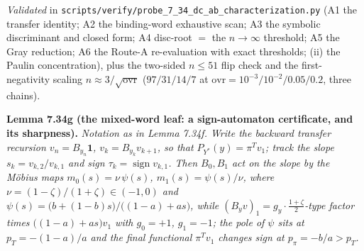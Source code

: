 \documentclass[
]{article}
\begin{document}
\emph{Validated} in
\texttt{scripts/verify/probe\_7\_34\_dc\_ab\_characterization.py} (A1 the
transfer identity; A2 the binding-word exhaustive scan; A3 the symbolic
discriminant and closed form; A4 disc-root $=$ the $n\to\infty$ threshold;
A5 the Gray reduction; A6 the Route-A re-evaluation with exact thresholds;
(ii) the Paulin concentration), plus the two-sided $n\le51$ flip check and
the first-negativity scaling $n\approx3/\sqrt{\mathrm{ovr}}$ ($97/31/14/7$
at $\mathrm{ovr}=10^{-3}/10^{-2}/0.05/0.2$, three chains).

\textbf{Lemma 7.34g (the mixed-word leaf: a sign-automaton certificate, and
its sharpness).} \emph{Notation as in Lemma 7.34f. Write the backward
transfer recursion $v_n=B_{y_n}\mathbf1$, $v_k=B_{y_k}v_{k+1}$, so that
$P_{Y^*}(y)=\pi^Tv_1$; track the slope $s_k=v_{k,2}/v_{k,1}$ and sign
$\tau_k=\operatorname{sign}v_{k,1}$. Then $B_0,B_1$ act on the slope by the
M\"obius maps $m_0(s)=\nu\,\psi(s)$, $m_1(s)=\psi(s)/\nu$, where
$\nu=(1-\zeta)/(1+\zeta)\in(-1,0)$ and $\psi(s)=\bigl(b+(1-b)s\bigr)/
\bigl((1-a)+as\bigr)$, while $(B_yv)_1=g_y\cdot\tfrac{1+\zeta}2$-type
factor times $\bigl((1-a)+as\bigr)v_1$ with $g_0=+1$, $g_1=-1$; the pole of
$\psi$ sits at $p_T=-(1-a)/a$ and the final functional $\pi^Tv_1$ changes
sign at $p_\pi=-b/a>p_T$.}
\end{document}
